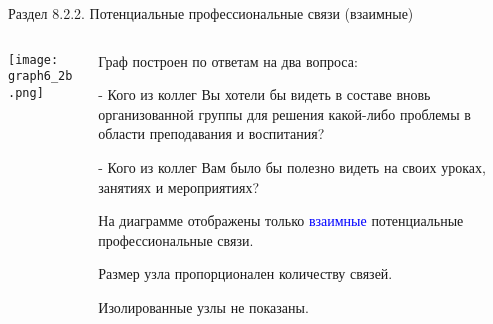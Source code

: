 \begin{frame}{Раздел 8.2.2. Потенциальные профессиональные связи (взаимные)}

\begin{columns} 
\begin{column}{0.75\textwidth}
\centering
          \texttt{[image: graph6\_2b.png]}
\end{column}
\begin{column}{0.25\textwidth} 

\tiny
Граф  построен по ответам на два вопроса:
\smallskip

- Кого из коллег Вы хотели бы видеть в составе вновь организованной группы для решения какой-либо проблемы в области преподавания и воспитания?
\smallskip

- Кого из коллег Вам было бы полезно видеть на своих уроках, занятиях и мероприятиях?
\smallskip

На диаграмме отображены только \textcolor{blue}{взаимные} потенциальные профессиональные связи.
\smallskip

Размер узла пропорционален количеству связей.
\smallskip

Изолированные узлы не показаны.

\end{column}
\end{columns}
\end{frame}


